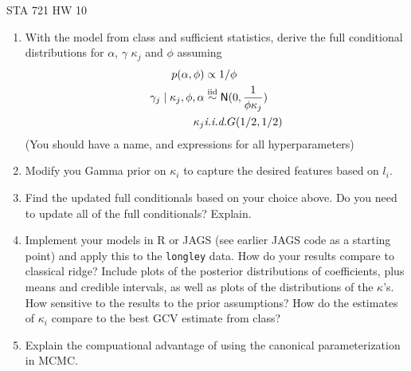 \documentclass{article}
\begin{document}
\begin{center}
  STA 721 HW 10
\end{center}

\begin{enumerate}
\item With the model from class and sufficient statistics, derive  the
  full conditional distributions  for  $\alpha$,   $\gamma$ $\kappa_j$
  and $\phi$ assuming 
  \begin{align}
    p(\alpha, \phi) & \propto 1/\phi \\
    \gamma_j \mid \kappa_j, \phi, \alpha & \mathrel{\mathop{\sim}\limits^{\rm iid}} \textsf{N}(0, \frac{1}{\phi
                                           \kappa_j}) \\
   \kappa_j & \textit{i.i.d.} G(1/2, 1/2)
  \end{align}
(You should have a name, and 
  expressions for all hyperparameters)
\item Modify you Gamma prior on $\kappa_i$ to capture the  desired features
  based on $l_i$. 

\item Find the updated full conditionals based on your choice above.
  Do you need to update all of the full conditionals?  Explain.

\item Implement your models in R or JAGS  (see earlier JAGS code as a
  starting point) and apply this to the {\tt longley} data.
 How do your results compare to classical ridge?  Include plots of the
 posterior distributions of coefficients, plus means and credible
 intervals, as well as plots of the distributions of the $\kappa$'s.
 How sensitive to the results to the prior assumptions?  How do the
 estimates of $\kappa_i$ compare to the best GCV estimate from class?

\item Explain the compuational advantage of using the canonical parameterization
  in  MCMC.
\end{enumerate}
\end{document}
